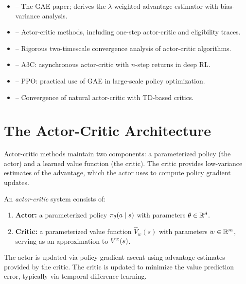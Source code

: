 \documentclass[11pt,a4paper]{article}
\begin{document}
\begin{itemize}
  \item \citet{schulman2015} -- The GAE paper; derives the
    $\lambda$-weighted advantage estimator with bias-variance analysis.
  \item \citet[Chapter 13]{suttonbarto2018} -- Actor-critic methods,
    including one-step actor-critic and eligibility traces.
  \item \citet{konda2003} -- Rigorous two-timescale convergence analysis
    of actor-critic algorithms.
  \item \citet{mnih2016} -- A3C: asynchronous actor-critic with
    $n$-step returns in deep RL.
  \item \citet{schulman2017} -- PPO: practical use of GAE in
    large-scale policy optimization.
  \item \citet{bhatnagar2009} -- Convergence of natural actor-critic
    with TD-based critics.
\end{itemize}

\section{The Actor-Critic Architecture}

Actor-critic methods maintain two components: a parameterized policy
(the actor) and a learned value function (the critic). The critic
provides low-variance estimates of the advantage, which the actor uses
to compute policy gradient updates.

\begin{definition}
\label{def:actor-critic}
An \emph{actor-critic} system consists of:
\begin{enumerate}[label=(\roman*)]
  \item \textbf{Actor:} a parameterized policy $\pi_\theta(a \mid s)$
    with parameters $\theta \in \mathbb{R}^d$.
  \item \textbf{Critic:} a parameterized value function $\hat{V}_w(s)$
    with parameters $w \in \mathbb{R}^m$, serving as an approximation to
    $V^{\pi}(s)$.
\end{enumerate}
The actor is updated via policy gradient ascent using advantage
estimates provided by the critic. The critic is updated to minimize the
value prediction error, typically via temporal difference learning.
\end{definition}
\end{document}
